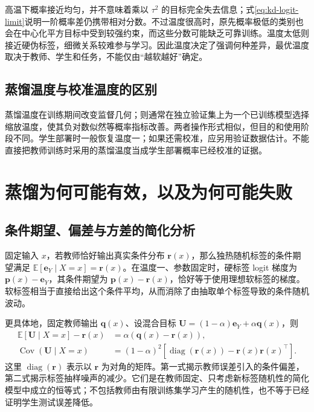 \documentclass[UTF8,12pt,a4paper,fontset=fandol]{ctexart}
\begin{document}
高温下概率接近均匀，并不意味着乘以 $\tau^2$ 的目标完全失去信息；式\eqref{eq:kd-logit-limit}说明一阶概率差仍携带相对分数。不过温度很高时，原先概率极低的类别也会在中心化平方目标中受到较强约束，而这些分数可能缺乏可靠训练。温度太低则接近硬伪标签，细微关系较难参与学习。因此温度决定了强调何种差异，最优温度取决于教师、学生和任务，不能仅由“越软越好”确定。

\subsection{蒸馏温度与校准温度的区别}
蒸馏温度在训练期间改变监督几何；则通常在独立验证集上为一个已训练模型选择缩放温度，使其负对数似然等概率指标改善。两者操作形式相似，但目的和使用阶段不同。学生部署时一般恢复温度一；如果还需校准，应另用验证数据估计。不能直接把教师训练时采用的蒸馏温度当成学生部署概率已经校准的证据。

\section{蒸馏为何可能有效，以及为何可能失败}
\label{sec:kd-mechanisms}

\subsection{条件期望、偏差与方差的简化分析}
固定输入 $x$，若教师恰好输出真实条件分布 $\mathbf r(x)$，那么独热随机标签的条件期望满足 $\mathbb E[\mathbf e_Y\mid X=x]=\mathbf r(x)$。在温度一、参数固定时，硬标签 logit 梯度为 $\mathbf p(x)-\mathbf e_Y$，其条件期望为 $\mathbf p(x)-\mathbf r(x)$，恰好等于使用理想软标签的梯度。软标签相当于直接给出这个条件平均，从而消除了由抽取单个标签导致的条件随机波动。

更具体地，固定教师输出 $\mathbf q(x)$、设混合目标 $\mathbf U=(1-\alpha)\mathbf e_Y+\alpha\mathbf q(x)$，则
\begin{align}
 \mathbb E[\mathbf U\mid X=x]-\mathbf r(x)
 &=\alpha(\mathbf q(x)-\mathbf r(x)),\label{eq:kd-target-bias}\\
 \operatorname{Cov}(\mathbf U\mid X=x)
 &=(1-\alpha)^2\left[\operatorname{diag}(\mathbf r(x))-
 \mathbf r(x)\mathbf r(x)^\top\right].\label{eq:kd-target-variance}
\end{align}
这里 $\operatorname{diag}(\mathbf r)$ 表示以 $\mathbf r$ 为对角的矩阵。第一式揭示教师误差引入的条件偏差，第二式揭示标签抽样噪声的减少。它们是在教师固定、只考虑新标签随机性的简化模型中成立的恒等式；不包括教师由有限训练集学习产生的随机性，也不等于已经证明学生测试误差降低。
\end{document}
